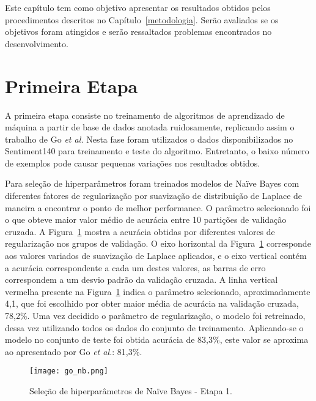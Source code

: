Este capítulo tem como objetivo apresentar os resultados obtidos pelos procedimentos descritos no
Capítulo~\ref{metodologia}.
Serão avaliados se os objetivos foram atingidos e serão ressaltados problemas encontrados no desenvolvimento.

\section{Primeira Etapa}

A primeira etapa consiste no treinamento de algoritmos de aprendizado de máquina a partir de base de dados anotada
ruidosamente, replicando assim o trabalho de Go \textit{et al.}
Nesta fase foram utilizados o dados disponibilizados no Sentiment140 para treinamento e teste do algoritmo.
Entretanto, o baixo número de exemplos pode causar pequenas variações nos resultados obtidos.

Para seleção de hiperparâmetros foram treinados modelos de Naïve Bayes com diferentes fatores de regularização por
suavização de distribuição de Laplace de maneira a encontrar o ponto de melhor performance.
O parâmetro selecionado foi o que obteve maior valor médio de acurácia entre 10 partições de validação cruzada.
A Figura~\ref{fig:go_nb} mostra a acurácia obtidas por diferentes valores de regularização nos grupos de validação.
O eixo horizontal da Figura~\ref{fig:go_nb} corresponde aos valores variados de suavização de Laplace aplicados, e o
eixo vertical contém a acurácia correspondente a cada um destes valores, as barras de erro correspondem a um desvio
padrão da validação cruzada.
A linha vertical vermelha presente na Figura~\ref{fig:go_nb} indica o parâmetro selecionado, aproximadamente 4,1, que
foi escolhido por obter maior média de acurácia na validação cruzada, 78,2\%.
Uma vez decidido o parâmetro de regularização, o modelo foi retreinado, dessa vez utilizando todos os dados do conjunto
de treinamento.
Aplicando-se o modelo no conjunto de teste foi obtida acurácia de 83,3\%, este valor se aproxima ao apresentado por Go
\textit{et al.}: 81,3\%.

\begin{figure}
\begin{center} {
    \begin{center}
    \texttt{[image: go\_nb.png]}
    \caption{Seleção de hiperparâmetros de Naïve Bayes - Etapa 1.}
    \label{fig:go_nb}
    \end{center}
}
\end{center}
\end{figure}

